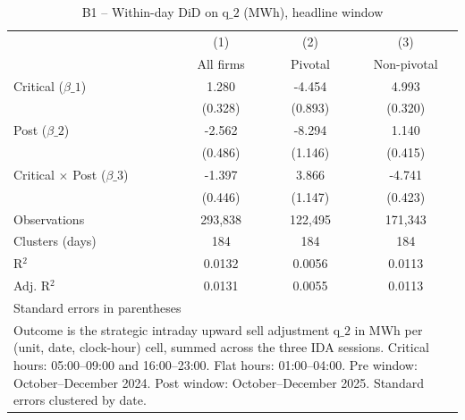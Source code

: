 \begin{table}[htbp]\centering
\caption{B1 -- Within-day DiD on q$\_2$ (MWh), headline window}
\begin{tabular}{l*{3}{c}}
\toprule
                    &\multicolumn{1}{c}{(1)}&\multicolumn{1}{c}{(2)}&\multicolumn{1}{c}{(3)}\\
                    &\multicolumn{1}{c}{All firms}&\multicolumn{1}{c}{Pivotal}&\multicolumn{1}{c}{Non-pivotal}\\
\midrule
Critical ($\beta\_1$)&       1.280&      -4.454&       4.993\\
                    &     (0.328)&     (0.893)&     (0.320)\\
\addlinespace
Post ($\beta\_2$)    &      -2.562&      -8.294&       1.140\\
                    &     (0.486)&     (1.146)&     (0.415)\\
\addlinespace
Critical $\times$ Post ($\beta\_3$)&      -1.397&       3.866&      -4.741\\
                    &     (0.446)&     (1.147)&     (0.423)\\
\midrule
Observations        &     293,838&     122,495&     171,343\\
Clusters (days)     &         184&         184&         184\\
R$^2$               &      0.0132&      0.0056&      0.0113\\
Adj. R$^2$          &      0.0131&      0.0055&      0.0113\\
\bottomrule
\multicolumn{4}{l}{\footnotesize Standard errors in parentheses}\\
\multicolumn{4}{l}{\footnotesize Outcome is the strategic intraday upward sell adjustment q$\_2$ in MWh per (unit, date, clock-hour) cell, summed across the three IDA sessions. Critical hours: 05:00--09:00 and 16:00--23:00. Flat hours: 01:00--04:00. Pre window: October--December 2024. Post window: October--December 2025. Standard errors clustered by date.}\\
\end{tabular}
\end{table}
